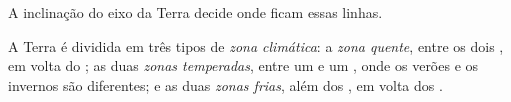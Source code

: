 A inclinação do eixo da Terra decide onde ficam essas linhas.

\begin{definition}\label{def:g5:weather-and-climate:climate-zone}
A Terra é dividida em três tipos de \emph{zona climática}: a \emph{zona quente}, entre os dois , em volta do ;
as duas \emph{zonas temperadas}, entre um  e um , onde
os verões e os invernos são diferentes; e as duas \emph{zonas frias}, além
dos , em volta dos .
\end{definition}

